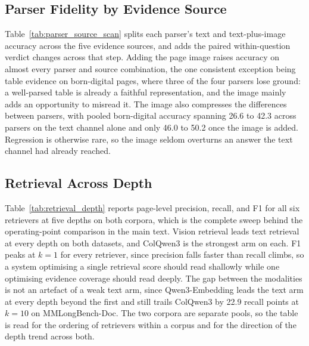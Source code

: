 \subsection{Parser Fidelity by Evidence Source}
\label{app:parser_fidelity}
Table~\ref{tab:parser_source_scan} splits each parser's text and text-plus-image accuracy across the five evidence sources, and adds the paired within-question verdict changes across that step. Adding the page image raises accuracy on almost every parser and source combination, the one consistent exception being table evidence on born-digital pages, where three of the four parsers lose ground: a well-parsed table is already a faithful representation, and the image mainly adds an opportunity to misread it. The image also compresses the differences between parsers, with pooled born-digital accuracy spanning 26.6 to 42.3 across parsers on the text channel alone and only 46.0 to 50.2 once the image is added. Regression is otherwise rare, so the image seldom overturns an answer the text channel had already reached.


\subsection{Retrieval Across Depth}
\label{app:retrieval_depth}
Table~\ref{tab:retrieval_depth} reports page-level precision, recall, and F1 for all six retrievers at five depths on both corpora, which is the complete sweep behind the operating-point comparison in the main text. Vision retrieval leads text retrieval at every depth on both datasets, and ColQwen3 is the strongest arm on each. F1 peaks at $k{=}1$ for every retriever, since precision falls faster than recall climbs, so a system optimising a single retrieval score should read shallowly while one optimising evidence coverage should read deeply. The gap between the modalities is not an artefact of a weak text arm, since Qwen3-Embedding leads the text arm at every depth beyond the first and still trails ColQwen3 by 22.9 recall points at $k{=}10$ on MMLongBench-Doc. The two corpora are separate pools, so the table is read for the ordering of retrievers within a corpus and for the direction of the depth trend across both.



